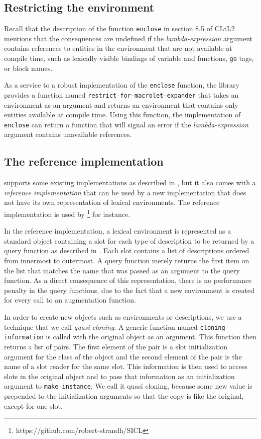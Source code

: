 \subsection{Restricting the environment}

Recall that the description of the function \texttt{enclose} in
section 8.5 of CLtL2 mentions that the consequences are undefined if
the \textit{lambda-expression} argument contains references to
entities in the environment that are not available at compile time,
such as lexically visible bindings of variable and functions,
\texttt{go} tags, or block names.

As a service to a robust implementation of the \texttt{enclose}
function, the \trucler{} library provides a function named
\texttt{restrict-for-macrolet-expander} that takes an environment as
an argument and returns an environment that contains only entities
available at compile time.  Using this function, the implementation of
\texttt{enclose} can return a function that will signal an error if
the \textit{lambda-expression} argument contains unavailable
references.

\subsection{The reference implementation}

\trucler{} supports some existing \commonlisp{} implementations as
described in , but it also
comes with a \emph{reference implementation} that can be used by a new
\commonlisp{} implementation that does not have its own representation
of lexical environments.  The reference implementation is used by
\sicl{}%
\footnote{https://github.com/robert-strandh/SICL} for instance.

In the reference implementation, a lexical environment is represented
as a standard object containing a slot for each type of description to
be returned by a query function as described in
.  Each slot contains a list of
descriptions ordered from innermost to outermost.  A query function
merely returns the first item on the list that matches the name that
was passed as an argument to the query function.  As a direct
consequence of this representation, there is no performance penalty in
the query functions, due to the fact that a new environment is created
for every call to an augmentation function.

In order to create new objects such as environments or descriptions,
we use a technique that we call \emph{quasi cloning}.  A generic
function named \texttt{cloning-information} is called with the
original object as an argument.  This function then returns a list of
pairs.  The first element of the pair is a slot initialization argument
for the class of the object and the second element of the pair is the
name of a slot reader for the same slot.  This information is then
used to access slots in the original object and to pass that
information as an initialization argument to \texttt{make-instance}.
We call it quasi cloning, because some new value is prepended to the
initialization arguments so that the copy is like the original, except
for one slot.

